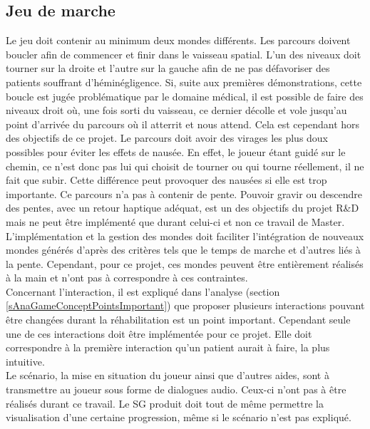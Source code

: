	\subsection*{Jeu de marche}
		Le jeu doit contenir au minimum deux mondes différents. Les parcours doivent boucler afin de commencer et finir dans le vaisseau spatial. L'un des niveaux doit tourner sur la droite et l'autre sur la gauche afin de ne pas défavoriser des patients souffrant d'héminégligence.
		Si, suite aux premières démonstrations, cette boucle est jugée problématique par le domaine médical, il est possible de faire des niveaux droit où, une fois sorti du vaisseau, ce dernier décolle et vole jusqu'au point d'arrivée du parcours où il atterrit et nous attend. Cela est cependant hors des objectifs de ce projet.
		Le parcours doit avoir des virages les plus doux possibles pour éviter les effets de nausée. En effet, le joueur étant guidé sur le chemin, ce n'est donc pas lui qui choisit de tourner ou qui tourne réellement, il ne fait que subir. Cette différence peut provoquer des nausées si elle est trop importante.		
		Ce parcours n'a pas à contenir de pente. Pouvoir gravir ou descendre des pentes, avec un retour haptique adéquat, est un des objectifs du projet R\&D mais ne peut être implémenté que durant celui-ci et non ce travail de Master.
		L'implémentation et la gestion des mondes doit faciliter l'intégration de nouveaux mondes générés d'après des critères tels que le temps de marche et d'autres liés à la pente. Cependant, pour ce projet, ces mondes peuvent être entièrement réalisés à la main et n'ont pas à correspondre à ces contraintes.
		\\
		
		Concernant l'interaction, il est expliqué dans l'analyse (section \ref{sAnaGameConceptPointsImportant}) que proposer plusieurs interactions pouvant être changées durant la réhabilitation est un point important. Cependant seule une de ces interactions doit être implémentée pour ce projet. Elle doit correspondre à la première interaction qu'un patient aurait à faire, la plus intuitive.
		\\
		
		Le scénario, la mise en situation du joueur ainsi que d'autres aides, sont à transmettre au joueur sous forme de dialogues audio. Ceux-ci n'ont pas à être réalisés durant ce travail. Le SG produit doit tout de même permettre la visualisation d'une certaine progression, même si le scénario n'est pas expliqué.
	
